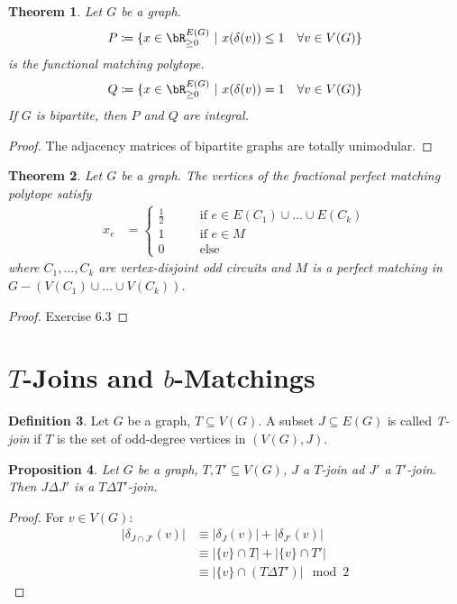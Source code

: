 \documentclass[11pt, a4paper]{article}
\newcommand{\abs}[1]{\left\lvert#1\right\rvert}
\newcommand{\set}[1]{\{#1\}}
\newtheorem{theorem}{Theorem}[section]
\newtheorem{prop}[theorem]{Proposition}
\theoremstyle{remark}
\theoremstyle{definition}
\newtheorem{definition}[theorem]{Definition}
\begin{document}

\begin{theorem}
	Let $G$ be a graph.
	\[P\coloneqq \set{x\in\bR_{\geq0}^{E(G)}\ |\ x(\delta(v))\leq 1 \quad\forall v\in V(G)}\]
	is the functional matching polytope.
	\[Q\coloneqq\set{x\in\bR_{\geq0}^{E(G)}\ |\ x(\delta(v))=1 \quad\forall v\in V(G)}\]
	If $G$ is bipartite, then $P$ and $Q$ are integral.
\end{theorem}
\begin{proof}
	The adjacency matrices of bipartite graphs are totally unimodular.
\end{proof}

\begin{theorem}
	Let $G$ be a graph. The vertices of the fractional perfect matching
	polytope satisfy
	\begin{align*}
		x_e & =\begin{cases}
			       \frac{1}{2} \qquad & \text{if }e\in E(C_1)\cup\ldots\cup E(C_k) \\
			       1 \qquad           & \text{if }e\in M                           \\
			       0 \qquad           & \text{else}
		       \end{cases}
	\end{align*}
	where $C_1,\ldots,C_k$ are vertex-disjoint odd circuits and $M$ is a perfect
	matching in $G-\left(V(C_1)\cup\ldots\cup V(C_k)\right)$.
\end{theorem}
\begin{proof}
	Exercise 6.3
\end{proof}

\section{\texorpdfstring{$T$}{T}-Joins and \texorpdfstring{$b$}{b}-Matchings}
\begin{definition}
	Let $G$ be a graph, $T\subseteq V(G)$. A subset $J\subseteq E(G)$ is called
	\emph{T-join} if $T$ is the set of odd-degree vertices in $(V(G),J)$.
\end{definition}

\begin{prop}\label{prop:t-join-symm-diff}
	Let $G$ be a graph, $T,T'\subseteq V(G)$, $J$ a $T$-join ad $J'$ a $T'$-join.
	Then $J\Delta J'$ is a $T\Delta T'$-join.
\end{prop}
\begin{proof}
	For $v\in V(G)$:
	\begin{align*}
		\abs{\delta_{J\cap J'}(v)} & \equiv \abs{\delta_J(v)}+\abs{\delta_{J'}(v)}   \\
		                           & \equiv \abs{\set{v}\cap T}+\abs{\set{v}\cap T'} \\
		                           & \equiv \abs{\set{v}\cap (T\Delta T')} \mod 2
	\end{align*}
\end{proof}
\end{document}
